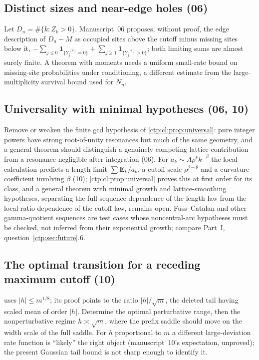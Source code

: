 \documentclass[11pt,a4paper]{article}
\numberwithin{equation}{section}
\theoremstyle{definition}
\theoremstyle{remark}
\newcommand{\ind}{\mathbf 1}
\begin{document}
\subsection{Distinct sizes and near-edge holes (06)}
Let $D_n=\#\{k:Z_k>0\}$. Manuscript~06 proposes, without proof, the edge
description of $D_n-M$ as occupied sites above the cutoff minus missing
sites below it,
$-\sum_{j\le0}\ind_{\{Y_j^{(\theta)}=0\}}+\sum_{j\ge1}\ind_{\{Y_j^{(\theta)}>0\}}$;
both limiting sums are almost surely finite. A theorem with moments needs a
uniform small-rate bound on missing-site probabilities under conditioning, a
different estimate from the large-multiplicity survival bound used for $N_n$.

\subsection{Universality with minimal hypotheses (06, 10)}
Remove or weaken the finite gcd hypothesis of \cref{ctp:cl:prop:universal}:
pure integer powers have strong root-of-unity resonances but much of the
same geometry, and a general theorem should distinguish a genuinely
competing lattice contribution from a resonance negligible after integration
(06). For $a_k\sim A\rho^kk^{-\beta}$ the local calculation predicts a
length limit $\sum\mathbf E_k/a_k$, a cutoff scale $\rho^{j-\theta}$ and a
curvature coefficient involving $\beta$ (10); \cref{ctp:cl:prop:universal}
proves this at first order for its class, and a general theorem with minimal
growth and lattice-smoothing hypotheses, separating the full-sequence
dependence of the length law from the local-ratio dependence of the cutoff
law, remains open. Fuss--Catalan and other gamma-quotient sequences are test
cases whose noncentral-arc hypotheses must be checked, not inferred from
their exponential growth; compare Part~I, question~\ref{ctp:sec:future}.6.

\subsection{The optimal transition for a receding maximum cutoff (10)}
 uses $|h|\le m^{1/8}$; its proof points to the
ratio $|h|/\sqrt m$, the deleted tail having scaled mean of order $|h|$.
Determine the optimal perturbative range, then the nonperturbative regime
$h\asymp\sqrt m$, where the prefix saddle should move on the width scale of
the full saddle. For $h$ proportional to $m$ a different large-deviation rate
function is ``likely'' the right object (manuscript~10's expectation,
unproved); the present Gaussian tail bound is not sharp enough to identify it.
\end{document}
